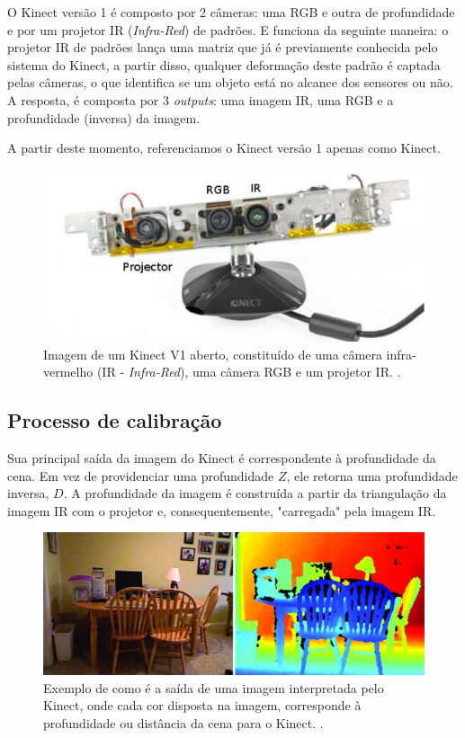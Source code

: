 O Kinect versão 1 é composto por 2 câmeras: uma RGB e outra de profundidade e por um projetor IR (\emph{Infra-Red}) de padrões. E funciona da seguinte maneira: o projetor IR de padrões lança uma matriz que já é previamente conhecida pelo sistema do Kinect, a partir disso, qualquer deformação deste padrão é captada pelas câmeras, o que identifica se um objeto está no alcance dos sensores ou não. A resposta, é composta por 3 \emph{outputs}: uma imagem IR,  uma RGB e a profundidade (inversa) da imagem. 

A partir deste momento, referenciamos o Kinect versão 1 apenas como Kinect.

\begin{figure}[!h]
	\centering
	\includegraphics[width=0.5\linewidth]{figs/kinect.png}
	\caption{%
	Imagem de um Kinect V1 aberto, constituído de uma câmera infra-vermelho (IR - \emph{Infra-Red}), uma câmera RGB e um projetor IR.
	\protect\cite{smisek20133d}.
	}\label{fig:kinect}
\end{figure}

\subsection*{Processo de calibração}

Sua principal saída da imagem do Kinect é correspondente à profundidade da cena. Em vez de providenciar uma profundidade $Z$, ele retorna uma profundidade inversa, $D$.
A profundidade da imagem é construída a partir da triangulação da imagem IR com o projetor e, consequentemente, "carregada" pela imagem IR.

\begin{figure}[!h]
	\centering
	\includegraphics[width=1\linewidth]{figs/profundidadekinect.png}
	\caption{%
	Exemplo de como é a saída de uma imagem interpretada pelo Kinect, onde cada cor disposta na imagem, corresponde à profundidade ou distância da cena para o Kinect.
	\cite{Silberman:ECCV12}.
	}\label{fig:profKinect}
\end{figure}
 
